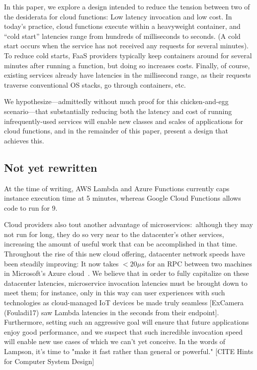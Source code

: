 In this paper, we explore a design intended to reduce the tension between two of
the desiderata for cloud functions:  Low latency invocation and low cost.  In
today's practice, cloud functions execute within a heavyweight container, and
``cold start'' latencies range from hundreds of milliseconds to seconds.  (A
cold start occurs when the service has not received any requests for several
minutes).  To reduce cold starts, FaaS providers typically keep containers
around for several minutes after running a function, but doing so increases
costs.  Finally, of course, existing services already have latencies in the
millisecond range, as their requests traverse conventional OS stacks, go through
containers, etc.

We hypothesize---admittedly without much proof for this chicken-and-egg
scenario---that substantially reducing both the latency and cost of running
infrequently-used services will enable new classes and scales of applications
for cloud functions, and in the remainder of this paper, present a design that
achieves this.

\subsection{Not yet rewritten}

At the time of writing, AWS Lambda and Azure Functions currently caps instance execution time at 5 minutes, whereas Google Cloud Functions allows code to run for 9.

Cloud providers also tout another advantage of microservices:\ although they may not run for long, they do so very near to the datacenter's other services, increasing the amount of useful work that can be accomplished in that time.
Throughout the rise of this new cloud offering, datacenter network speeds have been steadily improving:
It now takes $<20\mu{}s$ for an RPC between two machines in Microsoft's Azure cloud~\cite{www-firestone-azure-latency}.
We believe that in order to fully capitalize on these datacenter latencies, microservice invocation latencies must be brought down to meet them; for instance, only in this way can user experiences with such technologies as cloud-managed IoT devices be made truly seamless [ExCamera (Fouladi17) saw Lambda latencies in the seconds from their endpoint].
Furthermore, setting such an aggressive goal will ensure that future applications enjoy good performance, and we suspect that such incredible invocation speed will enable new use cases of which we can't yet conceive.
In the words of Lampson, it's time to "make it fast rather than general or powerful." [CITE Hints for Computer System Design]

